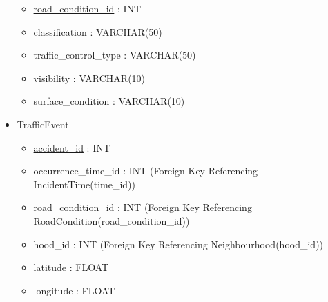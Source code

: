 \documentclass[12pt, a4paper]{article}
\begin{document}
\begin{itemize}
    \begin{itemize}
        \item \underline{road\_condition\_id} : INT
        \item classification : VARCHAR(50)
        \item traffic\_control\_type : VARCHAR(50)
        \item visibility : VARCHAR(10)
        \item surface\_condition : VARCHAR(10)
    \end{itemize}
    \item TrafficEvent
    \begin{itemize}
        \item \underline{accident\_id} : INT
        \item occurrence\_time\_id : INT (Foreign Key Referencing IncidentTime(time\_id))
        \item road\_condition\_id : INT (Foreign Key Referencing RoadCondition(road\_condition\_id))
        \item hood\_id : INT (Foreign Key Referencing Neighbourhood(hood\_id))
        \item latitude : FLOAT
        \item longitude : FLOAT
    \end{itemize}
\end{itemize}
\end{document}

